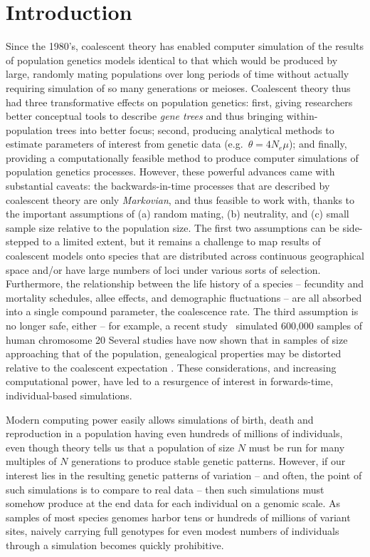\documentclass{article}
\begin{document}
\section*{Introduction}

Since the 1980's, coalescent theory has enabled computer simulation of the results of population genetics models
identical to that which would be produced by large, randomly mating populations over long periods of time
without actually requiring simulation of so many generations or meioses.
Coalescent theory thus had three transformative effects on population genetics:
first, giving researchers better conceptual tools to describe \emph{gene trees} and thus bringing within-population trees into better focus;
second, producing analytical methods to estimate parameters of interest from genetic data (e.g.\ $\theta = 4N_e \mu$);
and finally, providing a computationally feasible method to produce computer simulations of population genetics processes.
However, these powerful advances came with substantial caveats:
the backwards-in-time processes that are described by coalescent theory
are only \emph{Markovian}, and thus feasible to work with,
thanks to the important assumptions of
(a) random mating,
(b) neutrality,
and (c) small sample size relative to the population size.
The first two assumptions can be side-stepped to a limited extent,
but it remains a challenge to map results of coalescent models
onto species that are distributed across continuous geographical space
and/or have large numbers of loci under various sorts of selection.
Furthermore, the relationship between the life history of a species --
fecundity and mortality schedules, allee effects, and demographic fluctuations --
are all absorbed into a single compound parameter, the coalescence rate.
The third assumption is no longer safe, either --
for example, a recent study~\citep{martin2017human}
simulated 600,000 samples of human chromosome 20
Several studies have now shown that in samples of size approaching that of the population,
genealogical properties may be distorted relative to the coalescent expectation
\citep{wakeley2003gene,maruvka2011recovering,bhaskar2014distortion}.
These considerations, and increasing computational power, have led to a resurgence of interest in forwards-time, individual-based simulations.

Modern computing power easily allows simulations of birth, death and reproduction
in a population having even hundreds of millions of individuals,
even though theory tells us that a population of size $N$
must be run for many multiples of $N$ generations to produce stable genetic patterns.
However, if our interest lies in the resulting genetic patterns of variation
-- and often, the point of such simulations is to compare to real data --
then such simulations must somehow produce at the end data for each individual on a genomic scale.
As samples of most species genomes harbor tens or hundreds of millions of variant sites,
naively carrying full genotypes for even modest numbers of individuals through a simulation
becomes quickly prohibitive.
\end{document}

